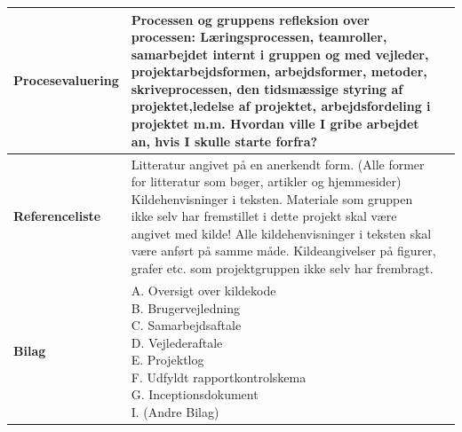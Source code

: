 \begin{longtable}{|p{30mm}|p{90mm}|p{25mm}|}
\textbf{Procesevaluering}   & Processen og gruppens refleksion over processen: Læringsprocessen, teamroller, samarbejdet internt i gruppen og med vejleder, projektarbejdsformen, arbejdsformer, metoder, skriveprocessen, den tidsmæssige styring af projektet,ledelse af projektet, arbejdsfordeling i projektet m.m. 
Hvordan ville I gribe arbejdet an, hvis I skulle starte forfra?
                                        &           \\ \hline

\textbf{Referenceliste}   & Litteratur angivet på en anerkendt form. 
(Alle former for litteratur som bøger, artikler og hjemmesider)
Kildehenvisninger i teksten. Materiale som gruppen ikke selv har fremstillet i dette projekt skal være angivet med kilde! 
Alle kildehenvisninger i teksten skal være anført på samme måde. Kildeangivelser på figurer, grafer etc. som projektgruppen ikke selv har frembragt. 
                                        &           \\ \hline

\textbf{Bilag}   &
\makecell[l]{
A. Oversigt over kildekode \\
B. Brugervejledning \\
C. Samarbejdsaftale \\
D. Vejlederaftale \\
E. Projektlog \\
F. Udfyldt rapportkontrolskema \\
G. Inceptionsdokument \\
I.  (Andre Bilag) \\
}
                                        &           \\ \hline

\end{longtable}

